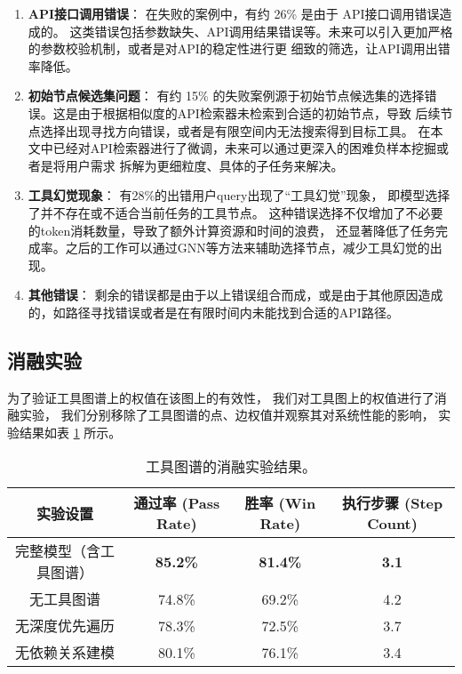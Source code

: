 \begin{enumerate}
    \item \textbf{API接口调用错误}：
    在失败的案例中，有约 26\% 是由于 API接口调用错误造成的。
    这类错误包括参数缺失、API调用结果错误等。未来可以引入更加严格的参数校验机制，或者是对API的稳定性进行更
    细致的筛选，让API调用出错率降低。

    \item \textbf{初始节点候选集问题}：
    有约 15\% 的失败案例源于初始节点候选集的选择错误。这是由于根据相似度的API检索器未检索到合适的初始节点，导致
    后续节点选择出现寻找方向错误，或者是有限空间内无法搜索得到目标工具。
    在本文中已经对API检索器进行了微调，未来可以通过更深入的困难负样本挖掘或者是将用户需求
    拆解为更细粒度、具体的子任务来解决。

    \item \textbf{工具幻觉现象}：
    有28\%的出错用户query出现了“工具幻觉”现象，
    即模型选择了并不存在或不适合当前任务的工具节点。
    这种错误选择不仅增加了不必要的token消耗数量，导致了额外计算资源和时间的浪费，
    还显著降低了任务完成率。之后的工作可以通过GNN等方法来辅助选择节点，减少工具幻觉的出现。

    \item \textbf{其他错误}：
    剩余的错误都是由于以上错误组合而成，或是由于其他原因造成的，如路径寻找错误或者是在有限时间内未能找到合适的API路径。

\end{enumerate}

\subsection{消融实验}

为了验证工具图谱上的权值在该图上的有效性，
我们对工具图上的权值进行了消融实验，
我们分别移除了工具图谱的点、边权值并观察其对系统性能的影响，
实验结果如表 \ref{tab:ablation} 所示。

\begin{table}[h]
\centering
\caption{工具图谱的消融实验结果。}
\label{tab:ablation}
\begin{tabular}{|c|c|c|c|}
\hline
\textbf{实验设置}       & \textbf{通过率 (Pass Rate)} & \textbf{胜率 (Win Rate)} & \textbf{执行步骤 (Step Count)} \\ \hline
完整模型（含工具图谱）  & \textbf{85.2\%}           & \textbf{81.4\%}          & \textbf{3.1}                  \\ \hline
无工具图谱              & 74.8\%                    & 69.2\%                   & 4.2                           \\ \hline
无深度优先遍历         & 78.3\%                    & 72.5\%                   & 3.7                           \\ \hline
无依赖关系建模         & 80.1\%                    & 76.1\%                   & 3.4                           \\ \hline
\end{tabular}
\end{table}


